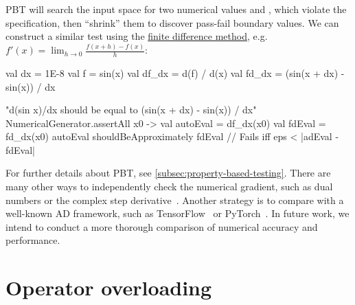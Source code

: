 %
PBT will search the input space for two numerical values  and , which violate the specification, then ``shrink'' them to discover pass-fail boundary values. We can construct a similar test using the \hyperref[sec:fdm]{finite difference method}, e.g. $f'(x)=\lim _{h\to 0}{\frac {f(x+h)-f(x)}{h}}$:
%
\begin{kotlinlisting}
val dx = 1E-8
val f = sin(x)
val df_dx = d(f) / d(x)
val fd_dx = (sin(x + dx) - sin(x)) / dx

"d(sin x)/dx should be equal to (sin(x + dx) - sin(x)) / dx" {
    NumericalGenerator.assertAll { x0 ->
        val autoEval = df_dx(x0)
        val fdEval = fd_dx(x0)
        autoEval shouldBeApproximately fdEval // Fails iff eps < |adEval - fdEval|
    }
}
\end{kotlinlisting}
%
For further details about PBT, see \autoref{subsec:property-based-testing}. There are many other ways to independently check the numerical gradient, such as dual numbers or the complex step derivative~\citep{martins2003complex}. Another strategy is to compare with a well-known AD framework, such as TensorFlow~\citep{abadi2016tensorflow} or PyTorch~\citep{paszke2019pytorch}. In future work, we intend to conduct a more thorough comparison of numerical accuracy and performance.

\section{Operator overloading}\label{sec:operator-overloading}

